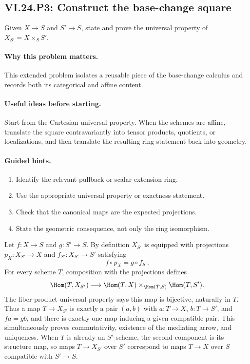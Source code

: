 \subsection*{VI.24.P3: Construct the base-change square}
\begin{problem}\label{prob:vi24-p03}
Given $X\to S$ and $S'\to S$, state and prove the universal property of $X_{S'}=X\times_SS'$.
\end{problem}

\ifdefined\FullProblemDossiers
\paragraph{Why this problem matters.}
This extended problem isolates a reusable piece of the base-change calculus and records both its categorical and affine content.

\paragraph{Useful ideas before starting.}
Start from the Cartesian universal property.  When the schemes are affine, translate the square contravariantly into tensor products, quotients, or localizations, and then translate the resulting ring statement back into geometry.

\paragraph{Guided hints.}
\begin{enumerate}
\item Identify the relevant pullback or scalar-extension ring.
\item Use the appropriate universal property or exactness statement.
\item Check that the canonical maps are the expected projections.
\item State the geometric consequence, not only the ring isomorphism.
\end{enumerate}

\begin{solution}
Let $f:X\to S$ and $g:S'\to S$.  By definition $X_{S'}$ is equipped with projections $p_X:X_{S'}\to X$ and $f_{S'}:X_{S'}\to S'$ satisfying
\[
f\circ p_X=g\circ f_{S'}.
\]
For every scheme $T$, composition with the projections defines
\[
\Hom(T,X_{S'})\longrightarrow
\Hom(T,X)\times_{\Hom(T,S)}\Hom(T,S').
\]
The fiber-product universal property says this map is bijective, naturally in $T$.  Thus a map $T\to X_{S'}$ is exactly a pair $(a,b)$ with $a:T\to X$, $b:T\to S'$, and $fa=gb$, and there is exactly one map inducing a given compatible pair.  This simultaneously proves commutativity, existence of the mediating arrow, and uniqueness.  When $T$ is already an $S'$-scheme, the second component is its structure map, so maps $T\to X_{S'}$ over $S'$ correspond to maps $T\to X$ over $S$ compatible with $S'\to S$.
\end{solution}

